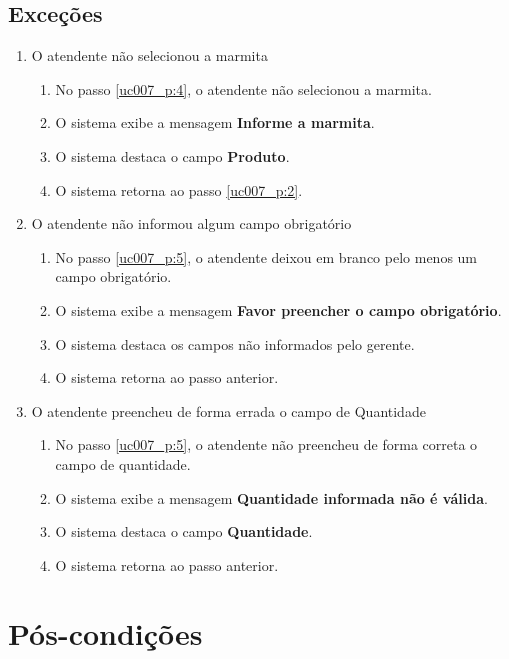 \subsection{Exceções}

\begin{enumerate}[label=E\arabic*]
	\item O atendente não selecionou a marmita \label{uc007_e:1}
	\begin{enumerate}[label*=.\arabic*]
		\item[] No passo \ref{uc007_p:4}, o atendente não selecionou a marmita.
		\item O sistema exibe a mensagem \textbf{Informe a marmita}.
		\item O sistema destaca o campo \textbf{Produto}.
		\item O sistema retorna ao passo \ref{uc007_p:2}.
	\end{enumerate}
	
	\item O atendente não informou algum campo obrigatório \label{uc007_e:2}
	\begin{enumerate}[label*=.\arabic*]
		\item[] No passo \ref{uc007_p:5}, o atendente deixou em branco pelo menos um campo obrigatório.
		\item O sistema exibe a mensagem \textbf{Favor preencher o campo obrigatório}.
		\item O sistema destaca os campos não informados pelo gerente.
		\item O sistema retorna ao passo anterior.
	\end{enumerate}
	
	\item O atendente preencheu de forma errada o campo de Quantidade \label{uc007_e:3}
	\begin{enumerate}[label*=.\arabic*]		
		\item[] No passo \ref{uc007_p:5}, o atendente não preencheu de forma correta o campo de quantidade.		
		\item O sistema exibe a mensagem \textbf{Quantidade informada não é válida}.
		\item O sistema destaca o campo \textbf{Quantidade}.
		\item O sistema retorna ao passo anterior.
	\end{enumerate}
\end{enumerate}

\section{Pós-condições}

